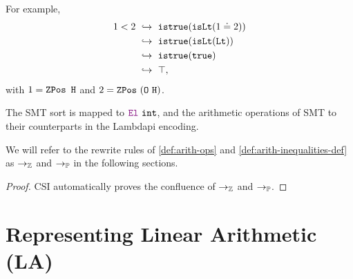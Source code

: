 \begin{example}
For example,
\begin{align*}
  1 < 2
  &\ \hookrightarrow\ \texttt{istrue}(\texttt{isLt}(1 \doteq 2)) \\
  &\ \hookrightarrow\ \texttt{istrue}(\texttt{isLt}(\texttt{Lt})) \\
  &\ \hookrightarrow\ \texttt{istrue}(\texttt{true}) \\
  &\ \hookrightarrow\ \top,
\end{align*}
with $1 = \mathop{\texttt{ZPos}}~\texttt{H}$ and $2 = \mathop{\texttt{ZPos}}~(\texttt{O}~\texttt{H})$.
\end{example}

The SMT sort  is mapped to $\el~\texttt{int}$, and the arithmetic operations of SMT to their counterparts in the Lambdapi encoding.

\begin{notation}
We will refer to the rewrite rules of \cref{def:arith-ops} and \cref{def:arith-inequalities-def} as $\ra_\Z$ \index{$\ra_\Z$} and $\rightarrow_\mathbb{P}$  in the following sections.
\end{notation}

\begin{lemma}
\begin{proof}
CSI \cite{CSI} automatically proves the confluence of $\rightarrow_\mathbb{Z}$ and $\rightarrow_\mathbb{P}$.
\end{proof}
\label{lemma:confluenceZP}
\end{lemma}

\section{Representing Linear Arithmetic (\uppercase{\textbf{LA})}}
\label{ssec:encoding-la}

